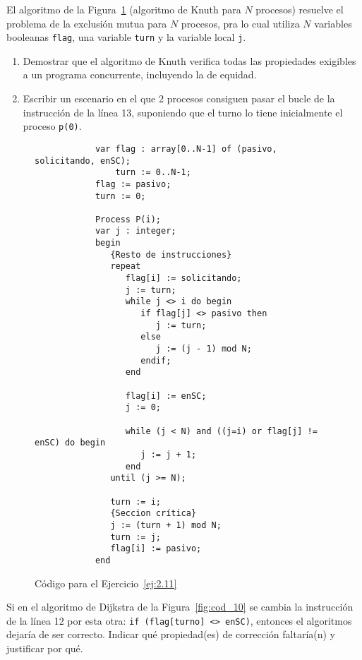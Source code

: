 \begin{ejercicio}\label{ej:2.11}
    El algoritmo de la Figura~\ref{fig:cod_11} (algoritmo de Knuth para $N$ procesos) resuelve el problema de la exclusión mutua para $N$ procesos, pra lo cual utiliza $N$ variables booleanas \verb|flag|, una variable \verb|turn| y la variable local \verb|j|.
    \begin{enumerate}[label=(\alph*)]
        \item Demostrar que el algoritmo de Knuth verifica todas las propiedades exigibles a un programa concurrente, incluyendo la de equidad.
        \item Escribir un escenario en el que 2 procesos consiguen pasar el bucle de la instrucción de la línea 13, suponiendo que el turno lo tiene inicialmente el proceso \verb|p(0)|.
    \end{enumerate}

    \begin{figure}
        \centering
        \begin{verbatim}
            var flag : array[0..N-1] of (pasivo, solicitando, enSC);
                turn := 0..N-1;
            flag := pasivo;
            turn := 0;

            Process P(i);
            var j : integer;
            begin
               {Resto de instrucciones}
               repeat
                  flag[i] := solicitando;
                  j := turn;
                  while j <> i do begin
                     if flag[j] <> pasivo then
                        j := turn;
                     else
                        j := (j - 1) mod N;
                     endif;
                  end

                  flag[i] := enSC;
                  j := 0;

                  while (j < N) and ((j=i) or flag[j] != enSC) do begin
                     j := j + 1;
                  end
               until (j >= N);

               turn := i;
               {Seccion crítica}
               j := (turn + 1) mod N;
               turn := j;
               flag[i] := pasivo;
            end
        \end{verbatim}
        \caption{Código para el Ejercicio~\ref{ej:2.11}}
        \label{fig:cod_11}
    \end{figure}
\end{ejercicio}

\begin{ejercicio}
    Si en el algoritmo de Dijkstra de la Figura~\ref{fig:cod_10} se cambia la instrucción de la línea 12 por esta otra: \verb|if (flag[turno] <> enSC)|, entonces el algoritmos dejaría de ser correcto. Indicar qué propiedad(es) de corrección faltaría(n) y justificar por qué.
\end{ejercicio}

